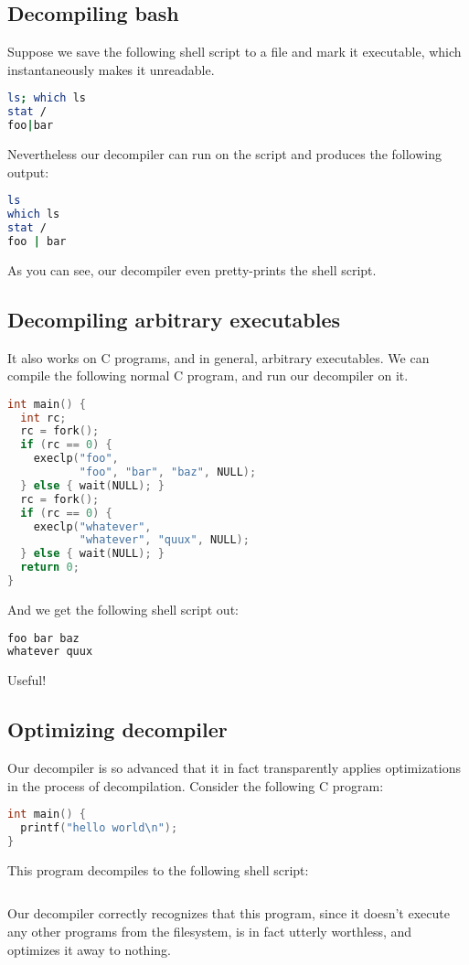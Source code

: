 \documentclass[sigplan]{acmart}
\begin{document}
\subsection{Decompiling bash}
Suppose we save the following shell script to a file and mark it executable,
which instantaneously makes it unreadable.
\begin{lstlisting}[language=bash]
ls; which ls
stat /
foo|bar
\end{lstlisting}
Nevertheless our decompiler can run on the script and produces the following output:
\begin{lstlisting}[language=bash]
ls
which ls
stat /
foo | bar
\end{lstlisting}
As you can see, our decompiler even pretty-prints the shell script.
\subsection{Decompiling arbitrary executables}
It also works on C programs, and in general, arbitrary executables.
We can compile the following normal C program, and run our decompiler on it.
\begin{lstlisting}[language=C]
int main() {
  int rc;
  rc = fork();
  if (rc == 0) {
    execlp("foo",
           "foo", "bar", "baz", NULL);
  } else { wait(NULL); }
  rc = fork();
  if (rc == 0) {
    execlp("whatever",
           "whatever", "quux", NULL);
  } else { wait(NULL); }
  return 0;
}
\end{lstlisting}
And we get the following shell script out:
\begin{lstlisting}[language=bash]
foo bar baz
whatever quux
\end{lstlisting}

Useful!

\subsection{Optimizing decompiler}
Our decompiler is so advanced that it in fact transparently applies optimizations in the process of decompilation.
Consider the following C program:
\begin{lstlisting}[language=C]
int main() {
  printf("hello world\n");
}
\end{lstlisting}
This program decompiles to the following shell script:
\begin{lstlisting}[language=bash]
\end{lstlisting}
Our decompiler correctly recognizes that this program,
since it doesn't execute any other programs from the filesystem,
is in fact utterly worthless, and optimizes it away to nothing.
\end{document}

